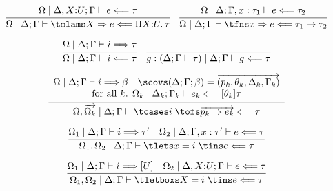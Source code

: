 %
\[
  \begin{array}{c}
  \infer{%
    \belchkjudg{\Omega \mid \goalctx{}}{\tmlams X \bto e}{\Pi X{:}U.\, \tau}
  }{%
    \belchkjudg{\Omega \mid \Delta, X{:}U; \Gamma}{e}{\tau}
  }
  \quad
  \infer{%
    \belchkjudg{\Omega \mid \goalctx{}}{\tfns x \bto e}{\tau_1 \to \tau_2}
  }{%
    \belchkjudg{\Omega \mid \Delta; \Gamma, x : \tau_1}{e}{\tau_2}
  }
    \\[1em]
\infer{%
\belchkjudg{\Omega \mid \goalctx{}}{i}{\tau}}
{\belsynjudg{\Omega \mid \goalctx{}}{i}{\tau}}
    \quad
    \infer{%
    \belchkjudg{g : (\goalctx{} \proves \tau) \mid \goalctx{}}{g}{\tau}
    }{}
\\[1em]
  \infer{%
    \belchkjudg{\Omega, \vec{\Omega_k} \mid \goalctx{}}{%
    \tcases i\;\tofs \vec{p_k \bto e_k}%
    }{\tau}
  }{%
    \begin{array}{c}
    \belsynjudg{\Omega \mid \goalctx{}}{i}{\beta}
      \quad
    \scovs (\Delta; \Gamma; \beta)
    = \vec{(p_k, \theta_k, \Delta_k, \Gamma_k)}
      \\
      \text{for all $k$. }
    \belchkjudg{\Omega_k \mid \goalctx{_k}}{e_k}{\msubst{\theta_k}{\tau}}
    \end{array}
  }

\\[1em]
 \infer{%
    \belchkjudg{\Omega_1, \Omega_2 \mid \goalctx{}}{\tlets x = i\;\tins e}{\tau}
  }{%
    \belsynjudg{\Omega_1 \mid \goalctx{}}{i}{\tau^\prime}
    &
    \belchkjudg{\Omega_2 \mid \Delta; \Gamma, x : \tau^\prime}{e}{\tau}
  }
      \\[1em]
  \infer{%
    \belchkjudg{\Omega_1, \Omega_2 \mid \goalctx{}}{\tletboxs X = i \;\tins e}{\tau}
  }{
    \belsynjudg{\Omega_1 \mid \goalctx{}}{i}{[U]}
    &
    \belchkjudg{\Omega_2 \mid \Delta, X{:}U; \Gamma}{e}{\tau}
  }
\end{array}
\]

